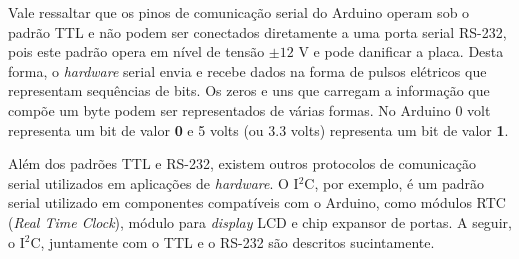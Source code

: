   Vale ressaltar que os pinos de comunicação serial do Arduino operam sob o padrão TTL e não podem ser conectados diretamente a uma porta serial RS-232, pois este padrão opera em nível de tensão $\pm 12$ V e pode danificar a placa. Desta forma, o \textit{hardware} serial envia e recebe dados na forma de pulsos elétricos que representam sequências de bits. Os zeros e uns que carregam a informação que compõe um byte podem ser representados de várias formas. No Arduino 0 volt representa um bit de valor \textbf{0} e 5 volts (ou 3.3 volts) representa um bit de valor \textbf{1}.

  Além dos padrões TTL e RS-232, existem outros protocolos de comunicação serial utilizados em aplicações de \textit{hardware}. O I$^{2}$C, por exemplo, é um padrão serial utilizado em componentes compatíveis com o Arduino, como módulos RTC (\textit{Real Time Clock}), módulo para \textit{display} LCD e chip expansor de portas. A seguir, o I$^{2}$C, juntamente com o TTL e o RS-232 são descritos sucintamente.


